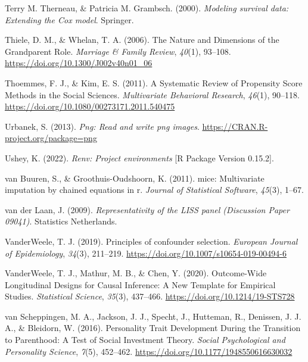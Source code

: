 \documentclass[
  english,
  man,floatsintext]{apa7}
\begin{document}
\leavevmode\hypertarget{ref-R-survival-book}{}%
Terry M. Therneau, \& Patricia M. Grambsch. (2000). \emph{Modeling survival data: Extending the Cox model}. Springer.

\leavevmode\hypertarget{ref-thieleNatureDimensionsGrandparent2006a}{}%
Thiele, D. M., \& Whelan, T. A. (2006). The Nature and Dimensions of the Grandparent Role. \emph{Marriage \& Family Review}, \emph{40}(1), 93--108. \url{https://doi.org/10.1300/J002v40n01_06}

\leavevmode\hypertarget{ref-thoemmesSystematicReviewPropensity2011}{}%
Thoemmes, F. J., \& Kim, E. S. (2011). A Systematic Review of Propensity Score Methods in the Social Sciences. \emph{Multivariate Behavioral Research}, \emph{46}(1), 90--118. \url{https://doi.org/10.1080/00273171.2011.540475}

\leavevmode\hypertarget{ref-R-png}{}%
Urbanek, S. (2013). \emph{Png: Read and write png images}. \url{https://CRAN.R-project.org/package=png}

\leavevmode\hypertarget{ref-R-renv}{}%
Ushey, K. (2022). \emph{Renv: Project environments} {[}R Package Version 0.15.2{]}.

\leavevmode\hypertarget{ref-mice2011}{}%
van Buuren, S., \& Groothuis-Oudshoorn, K. (2011). mice: Multivariate imputation by chained equations in r. \emph{Journal of Statistical Software}, \emph{45}(3), 1--67.

\leavevmode\hypertarget{ref-vanderlaanRepresentativityLISSPanel2009}{}%
van der Laan, J. (2009). \emph{Representativity of the LISS panel (Discussion Paper 09041)}. Statistics Netherlands.

\leavevmode\hypertarget{ref-vanderweelePrinciplesConfounderSelection2019}{}%
VanderWeele, T. J. (2019). Principles of confounder selection. \emph{European Journal of Epidemiology}, \emph{34}(3), 211--219. \url{https://doi.org/10.1007/s10654-019-00494-6}

\leavevmode\hypertarget{ref-vanderweeleOutcomeWideLongitudinalDesigns2020}{}%
VanderWeele, T. J., Mathur, M. B., \& Chen, Y. (2020). Outcome-Wide Longitudinal Designs for Causal Inference: A New Template for Empirical Studies. \emph{Statistical Science}, \emph{35}(3), 437--466. \url{https://doi.org/10.1214/19-STS728}

\leavevmode\hypertarget{ref-vanscheppingenPersonalityTraitDevelopment2016}{}%
van Scheppingen, M. A., Jackson, J. J., Specht, J., Hutteman, R., Denissen, J. J. A., \& Bleidorn, W. (2016). Personality Trait Development During the Transition to Parenthood: A Test of Social Investment Theory. \emph{Social Psychological and Personality Science}, \emph{7}(5), 452--462. \url{https://doi.org/10.1177/1948550616630032}
\end{document}
